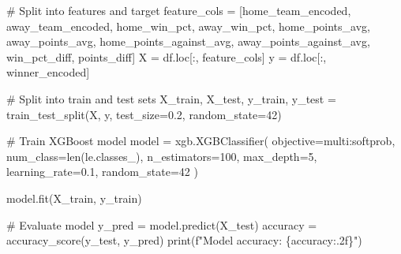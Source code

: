 \documentclass[
  letterpaper,
  DIV=11,
  numbers=noendperiod]{scrartcl}
\newenvironment{Shaded}{\begin{snugshade}}{\end{snugshade}}
\newcommand{\BuiltInTok}[1]{\textcolor[rgb]{0.00,0.23,0.31}{#1}}
\newcommand{\CommentTok}[1]{\textcolor[rgb]{0.37,0.37,0.37}{#1}}
\newcommand{\DecValTok}[1]{\textcolor[rgb]{0.68,0.00,0.00}{#1}}
\newcommand{\FloatTok}[1]{\textcolor[rgb]{0.68,0.00,0.00}{#1}}
\newcommand{\NormalTok}[1]{\textcolor[rgb]{0.00,0.23,0.31}{#1}}
\newcommand{\OperatorTok}[1]{\textcolor[rgb]{0.37,0.37,0.37}{#1}}
\newcommand{\SpecialCharTok}[1]{\textcolor[rgb]{0.37,0.37,0.37}{#1}}
\newcommand{\SpecialStringTok}[1]{\textcolor[rgb]{0.13,0.47,0.30}{#1}}
\newcommand{\StringTok}[1]{\textcolor[rgb]{0.13,0.47,0.30}{#1}}
\begin{document}
\begin{Shaded}
\begin{Highlighting}[]
\CommentTok{\# Split into features and target}
\NormalTok{feature\_cols }\OperatorTok{=}\NormalTok{ [}\StringTok{\textquotesingle{}home\_team\_encoded\textquotesingle{}}\NormalTok{, }\StringTok{\textquotesingle{}away\_team\_encoded\textquotesingle{}}\NormalTok{, }
                \StringTok{\textquotesingle{}home\_win\_pct\textquotesingle{}}\NormalTok{, }\StringTok{\textquotesingle{}away\_win\_pct\textquotesingle{}}\NormalTok{, }
                \StringTok{\textquotesingle{}home\_points\_avg\textquotesingle{}}\NormalTok{, }\StringTok{\textquotesingle{}away\_points\_avg\textquotesingle{}}\NormalTok{,}
                \StringTok{\textquotesingle{}home\_points\_against\_avg\textquotesingle{}}\NormalTok{, }\StringTok{\textquotesingle{}away\_points\_against\_avg\textquotesingle{}}\NormalTok{,}
                \StringTok{\textquotesingle{}win\_pct\_diff\textquotesingle{}}\NormalTok{, }\StringTok{\textquotesingle{}points\_diff\textquotesingle{}}\NormalTok{]}
\NormalTok{X }\OperatorTok{=}\NormalTok{ df.loc[:, feature\_cols]}
\NormalTok{y }\OperatorTok{=}\NormalTok{ df.loc[:, }\StringTok{\textquotesingle{}winner\_encoded\textquotesingle{}}\NormalTok{]}

\CommentTok{\# Split into train and test sets}
\NormalTok{X\_train, X\_test, y\_train, y\_test }\OperatorTok{=}\NormalTok{ train\_test\_split(X, y, test\_size}\OperatorTok{=}\FloatTok{0.2}\NormalTok{, random\_state}\OperatorTok{=}\DecValTok{42}\NormalTok{)}

\CommentTok{\# Train XGBoost model}
\NormalTok{model }\OperatorTok{=}\NormalTok{ xgb.XGBClassifier(}
\NormalTok{    objective}\OperatorTok{=}\StringTok{\textquotesingle{}multi:softprob\textquotesingle{}}\NormalTok{,}
\NormalTok{    num\_class}\OperatorTok{=}\BuiltInTok{len}\NormalTok{(le.classes\_),}
\NormalTok{    n\_estimators}\OperatorTok{=}\DecValTok{100}\NormalTok{,}
\NormalTok{    max\_depth}\OperatorTok{=}\DecValTok{5}\NormalTok{,}
\NormalTok{    learning\_rate}\OperatorTok{=}\FloatTok{0.1}\NormalTok{,}
\NormalTok{    random\_state}\OperatorTok{=}\DecValTok{42}
\NormalTok{)}

\NormalTok{model.fit(X\_train, y\_train)}

\CommentTok{\# Evaluate model}
\NormalTok{y\_pred }\OperatorTok{=}\NormalTok{ model.predict(X\_test)}
\NormalTok{accuracy }\OperatorTok{=}\NormalTok{ accuracy\_score(y\_test, y\_pred)}
\BuiltInTok{print}\NormalTok{(}\SpecialStringTok{f"Model accuracy: }\SpecialCharTok{\{}\NormalTok{accuracy}\SpecialCharTok{:.2f\}}\SpecialStringTok{"}\NormalTok{)}
\end{Highlighting}
\end{Shaded}
\end{document}
